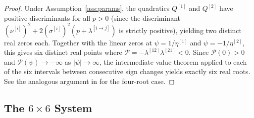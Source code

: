 \documentclass[11pt,a4paper]{article}
\numberwithin{equation}{section}
\begin{document}
\begin{appendices}
\begin{proof}
Under Assumption~\ref{ass:params}, the quadratics $Q^{[1]}$ and 
$Q^{[2]}$ have positive discriminants for all $p > 0$ (since the 
discriminant $(\nu^{[i]})^2 + 2(\sigma^{[i]})^2(p + \lambda^{[i \to j]})$ 
is strictly positive), yielding two distinct real zeros each. Together 
with the linear zeros at $\psi = 1/\eta^{[1]}$ and 
$\psi = -1/\eta^{[2]}$, this gives six distinct real points where 
$\mathcal{P} = -\lambda^{[12]}\lambda^{[21]} < 0$. Since 
$\mathcal{P}(0) > 0$ and $\mathcal{P}(\psi) \to -\infty$ as 
$|\psi| \to \infty$, the intermediate value theorem applied to each of 
the six intervals between consecutive sign changes yields exactly six 
real roots. See the analogous argument in \citet{Sepp2004} for the four-root case.
\end{proof}


\subsection{The $6 \times 6$ System}\label{app:6x6_system}


\end{appendices}
\end{document}
